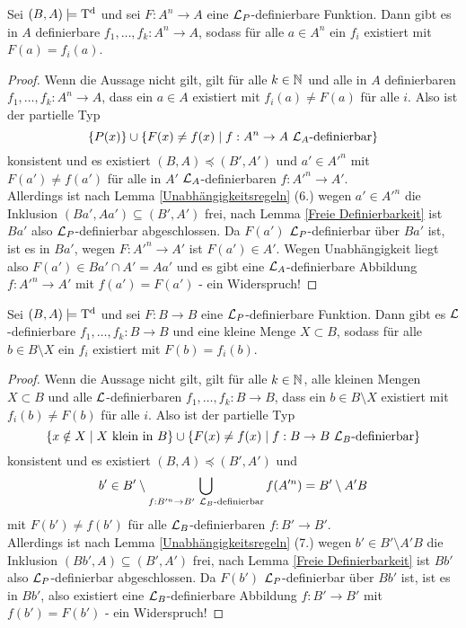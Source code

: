 \begin{lemma}
	Sei $(B,A)\models\operatorname{T^d}$ und sei $F:A^n\rightarrow A$ eine $\mathcal{L}_P$-definierbare Funktion. Dann gibt es in $A$ definierbare $f_1,\dots,f_k:A^n\rightarrow A$, sodass für alle $a\in A^n$ ein $f_i$ existiert mit $F(a)=f_i(a)$.
\end{lemma}
\begin{proof}
	Wenn die Aussage nicht gilt, gilt für alle $k\in\mathbb{N}$ und alle in $A$ definierbaren $f_1,\dots,f_k:A^n\rightarrow A$, dass ein $a\in A$ existiert mit $f_i(a)\neq F(a)$ für alle $i$. Also ist der partielle Typ $$\{P(x)\}\cup\{F(x)\neq f(x)\mid f:A^n\rightarrow A\ \mathcal{L}_A\text{-definierbar}\}$$ konsistent und es existiert $(B,A)\preceq(B',A')$ und $a'\in A'^n$ mit $F(a')\neq f(a')$ für alle in $A'$ $\mathcal{L}_A$-definierbaren $f:A'^n\rightarrow A'$.\\
	Allerdings ist nach Lemma \ref{Unabhängigkeitsregeln} (6.) wegen $a'\in A'^n$ die Inklusion $(Ba',Aa')\subseteq(B',A')$ frei, nach Lemma \ref{Freie Definierbarkeit} ist $Ba'$ also $\mathcal{L}_P$-definierbar abgeschlossen. Da $F(a')$ $\mathcal{L}_P$-definierbar über $Ba'$ ist, ist es in $Ba'$, wegen $F:A'^n\rightarrow A'$ ist $F(a')\in A'$. Wegen Unabhängigkeit liegt also $F(a')\in Ba'\cap A'=Aa'$ und es gibt eine $\mathcal{L}_A$-definierbare Abbildung $f:A'^n\rightarrow A'$ mit $f(a')=F(a')$ - ein Widerspruch!
\end{proof}

\begin{lemma}
	Sei $(B,A)\models\operatorname{T^d}$ und sei $F:B\rightarrow B$ eine $\mathcal{L}_P$-definierbare Funktion. Dann gibt es $\mathcal{L}$-definierbare $f_1,\dots,f_k:B\rightarrow B$ und eine kleine Menge $X\subset B$, sodass für alle $b\in B\setminus X$ ein $f_i$ existiert mit $F(b)=f_i(b)$.
\end{lemma}
\begin{proof}
	Wenn die Aussage nicht gilt, gilt für alle $k\in\mathbb{N}$, alle kleinen Mengen $X\subset B$ und alle $\mathcal{L}$-definierbaren $f_1,\dots,f_k:B\rightarrow B$, dass ein $b\in B\setminus X$ existiert mit $f_i(b)\neq F(b)$ für alle $i$. Also ist der partielle Typ $$\{x\notin X\mid X\text{ klein in }B\}\cup\{F(x)\neq f(x)\mid f:B\rightarrow B\ \lingua_B\text{-definierbar}\}$$ konsistent und es existiert $(B,A)\preceq(B',A')$ und $$b'\in B'\setminus\bigcup\limits_{f:B'^n\rightarrow B'\ \lingua_B\text{-definierbar}}f(A'^n)=B'\setminus A'B$$ mit $F(b')\neq f(b')$ für alle $\mathcal{L}_B$-definierbaren $f:B'\rightarrow B'$.\\
	Allerdings ist nach Lemma \ref{Unabhängigkeitsregeln} (7.) wegen $b'\in B'\setminus A'B$ die Inklusion $(Bb',A)\subseteq(B',A')$ frei, nach Lemma \ref{Freie Definierbarkeit} ist $Bb'$ also $\mathcal{L}_P$-definierbar abgeschlossen. Da $F(b')$ $\mathcal{L}_P$-definierbar über $Bb'$ ist, ist es in $Bb'$, also existiert eine $\mathcal{L}_B$-definierbare Abbildung $f:B'\rightarrow B'$ mit $f(b')=F(b')$ - ein Widerspruch!
\end{proof}

